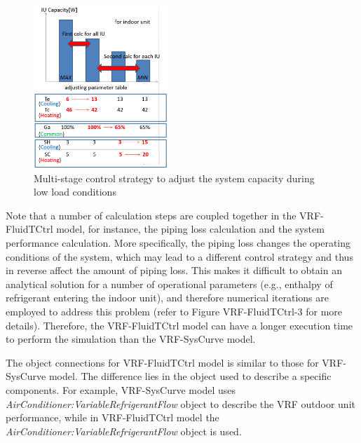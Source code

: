 \begin{figure}[hbtp] %
\centering
\includegraphics[width=0.45\textwidth, height=0.45\textheight, keepaspectratio=true]{media/VRF-FluidTCtrl-1a.png}
\caption{Multi-stage control strategy to adjust the system capacity during low load conditions \label{fig:multi-stage-control-strategy-to-adjust-the-system-capacity-during-low-load-conditions}}
\end{figure}

Note that a number of calculation steps are coupled together in the VRF-FluidTCtrl model, for instance, the piping loss calculation and the system performance calculation. More specifically, the piping loss changes the operating conditions of the system, which may lead to a different control strategy and thus in reverse affect the amount of piping loss. This makes it difficult to obtain an analytical solution for a number of operational parameters (e.g., enthalpy of refrigerant entering the indoor unit), and therefore numerical iterations are employed to address this problem (refer to Figure VRF-FluidTCtrl-3 for more details). Therefore, the VRF-FluidTCtrl model can have a longer execution time to perform the simulation than the VRF-SysCurve model. 

The object connections for VRF-FluidTCtrl model is similar to those for VRF-SysCurve model. The difference lies in the object used to describe a specific components. For example, VRF-SysCurve model uses \emph{AirConditioner:VariableRefrigerantFlow} object to describe the VRF outdoor unit performance, while in VRF-FluidTCtrl model the \emph{AirConditioner:VariableRefrigerantFlow} object is used.

